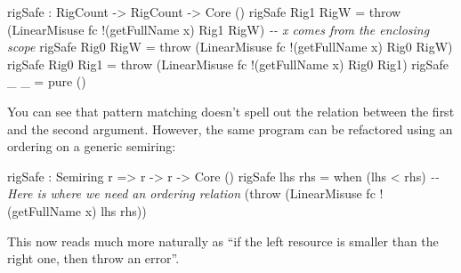 \documentclass[
]{article}
\newenvironment{Shaded}{}{}
\newcommand{\CommentTok}[1]{\textcolor[rgb]{0.38,0.63,0.69}{\textit{#1}}}
\newcommand{\DataTypeTok}[1]{\textcolor[rgb]{0.56,0.13,0.00}{#1}}
\newcommand{\FunctionTok}[1]{\textcolor[rgb]{0.02,0.16,0.49}{#1}}
\newcommand{\NormalTok}[1]{#1}
\newcommand{\OperatorTok}[1]{\textcolor[rgb]{0.40,0.40,0.40}{#1}}
\newcommand{\OtherTok}[1]{\textcolor[rgb]{0.00,0.44,0.13}{#1}}
\begin{document}
\begin{Shaded}
\begin{Highlighting}[]

\NormalTok{rigSafe }\OperatorTok{:} \DataTypeTok{RigCount} \OtherTok{{-}\textgreater{}} \DataTypeTok{RigCount} \OtherTok{{-}\textgreater{}} \DataTypeTok{Core}\NormalTok{ ()}
\NormalTok{  rigSafe }\DataTypeTok{Rig1} \DataTypeTok{RigW} \OtherTok{=}\NormalTok{ throw }
\NormalTok{    (}\DataTypeTok{LinearMisuse}\NormalTok{ fc }\OperatorTok{!}\NormalTok{(getFullName x) }\DataTypeTok{Rig1} \DataTypeTok{RigW}\NormalTok{)}
    \CommentTok{{-}{-} \textasciigrave{}x\textasciigrave{} comes from the enclosing scope}
\NormalTok{rigSafe }\DataTypeTok{Rig0} \DataTypeTok{RigW} \OtherTok{=}\NormalTok{ throw}
\NormalTok{    (}\DataTypeTok{LinearMisuse}\NormalTok{ fc }\OperatorTok{!}\NormalTok{(getFullName x) }\DataTypeTok{Rig0} \DataTypeTok{RigW}\NormalTok{)}
\NormalTok{rigSafe }\DataTypeTok{Rig0} \DataTypeTok{Rig1} \OtherTok{=}\NormalTok{ throw }
\NormalTok{    (}\DataTypeTok{LinearMisuse}\NormalTok{ fc }\OperatorTok{!}\NormalTok{(getFullName x) }\DataTypeTok{Rig0} \DataTypeTok{Rig1}\NormalTok{)}
\NormalTok{rigSafe \_ \_ }\OtherTok{=} \FunctionTok{pure}\NormalTok{ ()}
\end{Highlighting}
\end{Shaded}

You can see that pattern matching doesn't spell out the relation between
the first and the second argument. However, the same program can be
refactored using an ordering on a generic semiring:

\begin{Shaded}
\begin{Highlighting}[]
\NormalTok{rigSafe }\OperatorTok{:} \DataTypeTok{Semiring}\NormalTok{ r }\OtherTok{=\textgreater{}}\NormalTok{ r }\OtherTok{{-}\textgreater{}}\NormalTok{ r }\OtherTok{{-}\textgreater{}} \DataTypeTok{Core}\NormalTok{ ()}
\NormalTok{rigSafe lhs rhs }\OtherTok{=} 
\NormalTok{  when (lhs }\OperatorTok{\textless{}}\NormalTok{ rhs) }\CommentTok{{-}{-} Here is where we need an ordering relation}
\NormalTok{       (throw (}\DataTypeTok{LinearMisuse}\NormalTok{ fc }\OperatorTok{!}\NormalTok{(getFullName x) lhs rhs))}
\end{Highlighting}
\end{Shaded}

This now reads much more naturally as ``if the left resource is smaller
than the right one, then throw an error''.
\end{document}
